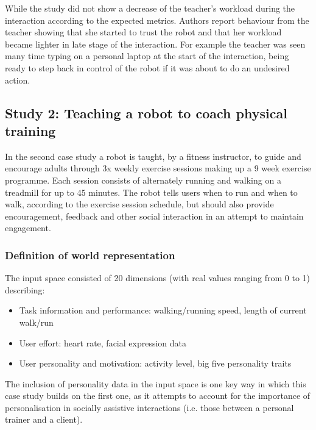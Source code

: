 \documentclass[manuscript, review, anonymous]{acmart}
\begin{document}
While the study did not show a decrease of the teacher's workload during the interaction
according to the expected metrics.
Authors report behaviour from the teacher showing that she started to trust the robot 
and that her workload became lighter in late stage of the interaction. For example the teacher 
was seen many time typing on a personal laptop at the start of the interaction, being ready to
step back in control of the robot if it was about to do an undesired action.

\subsection{Study 2: Teaching a robot to coach physical training}
In the second case study a robot is taught, by a fitness instructor, to guide and encourage adults through
3x weekly exercise sessions making up a 9 week exercise programme. Each session consists of  
alternately running and walking on a treadmill for up to 45 minutes. The robot tells users when to run and when 
to walk, according to the exercise session schedule, but should also provide encouragement,
feedback and other social interaction in an attempt to maintain engagement. 

\subsubsection{Definition of world representation}
The input space consisted of 20 dimensions (with real values ranging from 0 to 1) describing:
\begin{itemize}
    \item Task information and performance: walking/running speed, length of current walk/run
    \item User effort: heart rate, facial expression data
    \item User personality and motivation: activity level, big five personality traits~\cite{goslingVeryBriefMeasure2003}  
\end{itemize}

The inclusion of personality data in the input space is one key way in which
this case study builds on the first one, as it attempts to account for the importance
of personalisation in socially assistive interactions (i.e. those between a personal trainer
and a client). 
\end{document}
